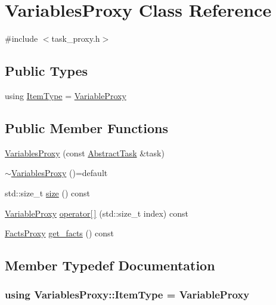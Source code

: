 \hypertarget{classVariablesProxy}{\section{Variables\-Proxy Class Reference}
\label{classVariablesProxy}
}


{\ttfamily \#include $<$task\-\_\-proxy.\-h$>$}

\subsection*{Public Types}
\begin{DoxyCompactItemize}
\item 
using \hyperlink{classVariablesProxy_a093cf096f5e5f2e806fea7897f217a8a}{Item\-Type} = \hyperlink{classVariableProxy}{Variable\-Proxy}
\end{DoxyCompactItemize}
\subsection*{Public Member Functions}
\begin{DoxyCompactItemize}
\item 
\hyperlink{classVariablesProxy_a9f1b14cf71a9526acdbcbe38d309cfc3}{Variables\-Proxy} (const \hyperlink{classAbstractTask}{Abstract\-Task} \&task)
\item 
\hyperlink{classVariablesProxy_a82feb1ab73c4712ab20a829f474bd98e}{$\sim$\-Variables\-Proxy} ()=default
\item 
std\-::size\-\_\-t \hyperlink{classVariablesProxy_a01cfc73991b2c4a149dd778358531527}{size} () const 
\item 
\hyperlink{classVariableProxy}{Variable\-Proxy} \hyperlink{classVariablesProxy_abbed7eda6d29581678adb86a406cab2f}{operator\mbox{[}$\,$\mbox{]}} (std\-::size\-\_\-t index) const 
\item 
\hyperlink{classFactsProxy}{Facts\-Proxy} \hyperlink{classVariablesProxy_aaa996eb919f39adf2b80cba50c994b92}{get\-\_\-facts} () const 
\end{DoxyCompactItemize}


\subsection{Member Typedef Documentation}
\hypertarget{classVariablesProxy_a093cf096f5e5f2e806fea7897f217a8a}{
\subsubsection[{Item\-Type}]{\setlength{\rightskip}{0pt plus 5cm}using {\bf Variables\-Proxy\-::\-Item\-Type} =  {\bf Variable\-Proxy}}}\label{classVariablesProxy_a093cf096f5e5f2e806fea7897f217a8a}



